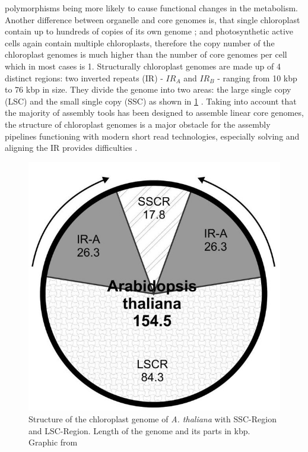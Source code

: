 polymorphisms being more likely to cause functional changes in the metabolism. Another difference between
organelle and core genomes is, that single chloroplast contain up to hundreds of copies of its own genome
\cite{kumar_2014}; \cite{bendich_1987} and photosynthetic active cells again contain multiple chloroplasts,
therefore the copy number of the chloroplast genomes is much higher than the number of core genomes per cell
which in most cases is 1. \newline Structurally chloroplast genomes are made up of 4 distinct regions: two
inverted repeats (IR) - $IR_A$ and $IR_B$ - ranging from 10 kbp to 76 kbp in size. They divide the genome into
two areas: the large single copy (LSC) and the small single copy (SSC) as shown in \ref{fig:cpast_genome}
\cite{palmer_1985}. Taking into account that the majority of assembly tools has been designed to assemble
linear core genomes, the structure of chloroplast genomes is a major obstacle for the assembly pipelines
functioning with modern short read technologies, especially solving and aligning the IR provides difficulties
\cite{Wang2018}.

\begin{figure}[H]
\centering
\includegraphics[height=.55\textheight, width=.95\textwidth]{Figures/cpast}
\decoRule
\caption[Structure of a chloroplast genome]{Structure of the chloroplast genome of \textit{A. thaliana} with SSC-Region and LSC-Region. Length of the genome and its parts in kbp. Graphic from \cite{olejniczak2016chloroplasts}}
\label{fig:cpast_genome}
\end{figure}

